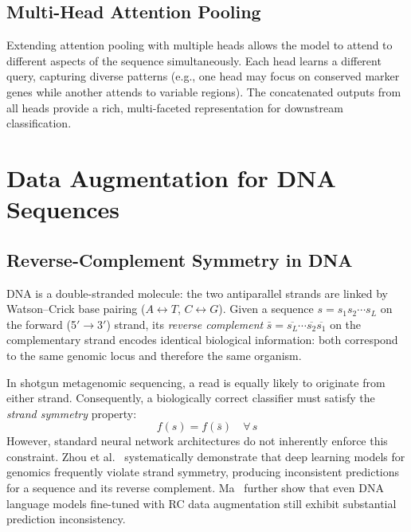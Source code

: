 \subsection{Multi-Head Attention Pooling}

Extending attention pooling with multiple heads allows the model to attend to different aspects of the sequence simultaneously. Each head learns a different query, capturing diverse patterns (e.g., one head may focus on conserved marker genes while another attends to variable regions). The concatenated outputs from all heads provide a rich, multi-faceted representation for downstream classification.

\section{Data Augmentation for DNA Sequences}
\label{sec:bg-augmentation}

\subsection{Reverse-Complement Symmetry in DNA}
\label{sec:bg-rc-symmetry}

DNA is a double-stranded molecule: the two antiparallel strands are linked by Watson--Crick base pairing ($A \leftrightarrow T$, $C \leftrightarrow G$). Given a sequence $s = s_1 s_2 \cdots s_L$ on the forward (5$'$$\to$3$'$) strand, its \emph{reverse complement} $\bar{s} = \overline{s_L} \cdots \overline{s_2} \overline{s_1}$ on the complementary strand encodes identical biological information: both correspond to the same genomic locus and therefore the same organism.

In shotgun metagenomic sequencing, a read is equally likely to originate from either strand. Consequently, a biologically correct classifier must satisfy the \emph{strand symmetry} property:
\begin{equation}
    f(s) = f(\bar{s}) \quad \forall\, s
    \label{eq:strand-symmetry}
\end{equation}
However, standard neural network architectures do not inherently enforce this constraint. Zhou et al.~\cite{Zhou2022rc} systematically demonstrate that deep learning models for genomics frequently violate strand symmetry, producing inconsistent predictions for a sequence and its reverse complement. Ma~\cite{Ma2025rc} further show that even DNA language models fine-tuned with RC data augmentation still exhibit substantial prediction inconsistency.

